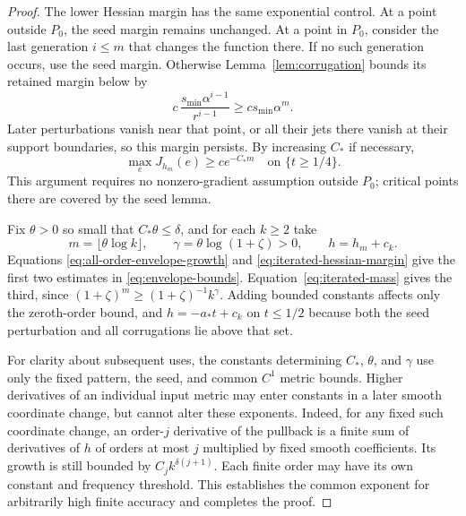 \begin{proof}
The lower Hessian margin has the same exponential control.
At a point outside $P_0$, the seed margin remains unchanged.  At a
point in $P_0$, consider the last generation $i\le m$ that changes
the function there.  If no such generation occurs, use the seed
margin.  Otherwise Lemma~\ref{lem:corrugation} bounds its retained
margin below by
\[
 c\,\frac{s_{\min}\alpha^{i-1}}{r^{i-1}}
 \ge c s_{\min}\alpha^m.
\]
Later perturbations vanish near that point, or all their jets there
vanish at their support boundaries, so this margin persists.  By
increasing $C_*$ if necessary,
\begin{equation}\label{eq:iterated-hessian-margin}
 \max_eJ_{h_m}(e)\ge c e^{-C_*m}
 \quad\text{on }\{t\ge1/4\}.
\end{equation}
This argument requires no nonzero-gradient assumption outside
$P_0$; critical points there are covered by the seed lemma.

Fix $\theta>0$ so small that $C_*\theta\le\delta$, and for each
$k\ge2$ take
\[
 m=\lfloor\theta\log k\rfloor,
 \qquad \gamma=\theta\log(1+\zeta)>0,
 \qquad h=h_m+c_k.
\]
Equations \eqref{eq:all-order-envelope-growth} and
\eqref{eq:iterated-hessian-margin} give the first two estimates in
\eqref{eq:envelope-bounds}.  Equation~\eqref{eq:iterated-mass}
gives the third, since
$(1+\zeta)^m\ge(1+\zeta)^{-1}k^\gamma$.
Adding bounded constants affects only the zeroth-order bound, and
$h=-a_*t+c_k$ on $t\le1/2$ because both the seed perturbation and
all corrugations lie above that set.

For clarity about subsequent uses, the constants determining
$C_*$, $\theta$, and $\gamma$ use only the fixed pattern, the
seed, and common $C^1$ metric bounds.  Higher derivatives of an
individual input metric may enter constants in a later smooth
coordinate change, but cannot alter these exponents.  Indeed, for
any fixed such coordinate change, an order-$j$ derivative of the
pullback is a finite sum of derivatives of $h$ of orders at most
$j$ multiplied by fixed smooth coefficients.  Its growth is still
bounded by $C_jk^{\delta(j+1)}$.  Each finite order may have its
own constant and frequency threshold.  This establishes the common
exponent for arbitrarily high finite accuracy and completes the
proof.
\end{proof}
